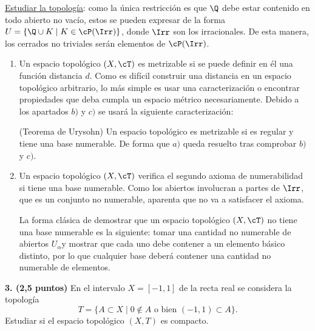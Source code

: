 \begin{solucion}
    \underline{Estudiar la topología}: como la única restricción es que $\Q$ debe estar contenido en todo abierto no vacío, estos se pueden expresar de la forma $U = \{\Q \cup K \mid K \in \cP(\Irr)\}$, donde $\Irr$ son los irracionales. De esta manera, los cerrados no triviales serán elementos de $\cP(\Irr)$.

    \begin{enumerate}[label=\alph*)]
        \item Un espacio topológico $(X,\cT)$ es metrizable si se puede definir en él una función distancia $d$. Como es difícil construir una distancia en un espacio topológico arbitrario, lo más simple es usar una caracterización o encontrar propiedades que deba cumpla un espacio métrico necesariamente. Debido a los apartados $b)$ y $c)$ se usará la siguiente caracterización:
        
        (Teorema de Urysohn) Un espacio topológico es metrizable si es regular y tiene una base numerable. De forma que $a)$ queda resuelto tras comprobar $b)$ y $c)$.

        \item Un espacio topológico $(X,\cT)$ verifica el segundo axioma de numerabilidad si tiene una base numerable. Como los abiertos involucran a partes de $\Irr$, que es un conjunto no numerable, aparenta que no va a satisfacer el axioma.
        
        La forma clásica de demostrar que un espacio topológico $(X,\cT)$ no tiene una base numerable es la siguiente: tomar una cantidad no numerable de abiertos $U_\alpha$y mostrar que cada uno debe contener a un elemento básico distinto, por lo que cualquier base deberá contener una cantidad no numerable de elementos.
        
    \end{enumerate}
\end{solucion}

\begin{enunciado}
    \hypertarget{2023 B 3}{}
    \textbf{3. (2,5 puntos)} En el intervalo \(X = [-1, 1]\) de la recta real se considera la topología
    \[
        T = \{A \subset X \mid 0 \notin A \text{ o bien } (-1, 1) \subset A\}.
    \]
    Estudiar si el espacio topológico \((X, T)\) es compacto.
\end{enunciado}